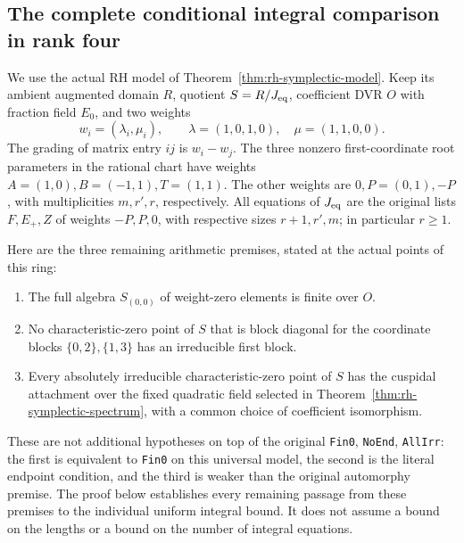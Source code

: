 \subsection{The complete conditional integral comparison in rank four}
\label{sec:rh-symplectic-length}

We use the actual RH model of
Theorem~\ref{thm:rh-symplectic-model}. Keep its ambient augmented
domain \(R\), quotient \(S=R/J_{\rm eq}\), coefficient DVR \(O\)
with fraction field \(E_0\), and two weights
\[
 w_i=(\lambda_i,\mu_i),\qquad
 \lambda=(1,0,1,0),\quad \mu=(1,1,0,0).
\]
The grading of matrix entry \(ij\) is \(w_i-w_j\).
The three nonzero first-coordinate root parameters in the rational
chart have weights \(A=(1,0), B=(-1,1), T=(1,1)\).
The other weights are \(0,P=(0,1),-P\), with multiplicities
\(m,r',r\), respectively. All equations of \(J_{\rm eq}\)
are the original lists \(F,E_+,Z\) of weights \(-P,P,0\),
with respective sizes \(r+1,r',m\); in particular \(r\ge1\).

Here are the three remaining arithmetic premises, stated at the
actual points of this ring:
\begin{enumerate}
\item[(F)] The full algebra \(S_{(0,0)}\) of weight-zero
elements is finite over \(O\).
\item[(E)] No characteristic-zero point of \(S\) that is
block diagonal for the coordinate blocks \(\{0,2\},\{1,3\}\)
has an irreducible first block.
\item[(A)] Every absolutely irreducible characteristic-zero point
of \(S\) has the cuspidal attachment over the fixed quadratic
field selected in Theorem~\ref{thm:rh-symplectic-spectrum},
with a common choice of coefficient isomorphism.
\end{enumerate}
These are not additional hypotheses on top of the original
\texttt{Fin0}, \texttt{NoEnd}, \texttt{AllIrr}:
the first is equivalent to \texttt{Fin0} on this universal
model, the second is the literal endpoint condition, and the
third is weaker than the original automorphy premise.
The proof below establishes every remaining passage from these
premises to the individual uniform integral bound. It does
not assume a bound on the lengths or a bound on the number of
integral equations.

